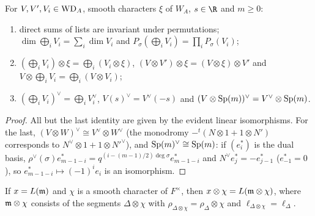 \begin{lemma}\label{pf:llc:wdid}
For $V,V',V_i\in\mathrm{WD}_A$, smooth characters $\xi$ of $W_A$, $s\in\R$ and $m\ge0$:
\begin{enumerate}[label=(\alph*)]
\item direct sums of lists are invariant under permutations; $\dim\bigoplus_iV_i=\sum_i\dim V_i$ and
  $P_\sigma(\bigoplus_iV_i)=\prod_iP_\sigma(V_i)$;
\item $(\bigoplus_iV_i)\otimes\xi=\bigoplus_i(V_i\otimes\xi)$, $(V\otimes V')\otimes\xi=(V\otimes\xi)\otimes V'$ and
  $V\otimes\bigoplus_iV_i=\bigoplus_i(V\otimes V_i)$;
\item $(\bigoplus_iV_i)^\vee=\bigoplus_iV_i^\vee$, $V(s)^\vee=V^\vee(-s)$ and $(V\otimes\operatorname{Sp}(m))^\vee=V^\vee\otimes\operatorname{Sp}(m)$.
\end{enumerate}
\end{lemma}

\begin{proof}
All but the last identity are given by the evident linear isomorphisms. For the last, $(V\otimes W)^\vee\cong V^\vee\otimes
W^\vee$ (the monodromy $-{}^t(N\otimes1+1\otimes N')$ corresponds to $N^\vee\otimes1+1\otimes N'^\vee$), and $\operatorname{Sp}(m)^\vee\cong
\operatorname{Sp}(m)$: if $(e_i^*)$ is the dual basis, $\rho^\vee(\sigma)e^*_{m-1-i}=q^{(i-(m-1)/2)\deg\sigma}e^*_{m-1-i}$ and
$N^\vee e^*_j=-e^*_{j-1}$ ($e^*_{-1}=0$), so $e^*_{m-1-i}\mapsto(-1)^ie_i$ is an isomorphism.
\end{proof}

\begin{lemma}\label{pf:llc:twl}
If $x=L(\mathfrak m)$ and $\chi$ is a smooth character of $F^\times$, then $x\otimes\chi=L(\mathfrak m\otimes\chi)$, where $\mathfrak m\otimes\chi$ consists
of the segments $\Delta\otimes\chi$ with $\rho_{\Delta\otimes\chi}=\rho_\Delta\otimes\chi$ and $\ell_{\Delta\otimes\chi}=\ell_\Delta$.
\end{lemma}

